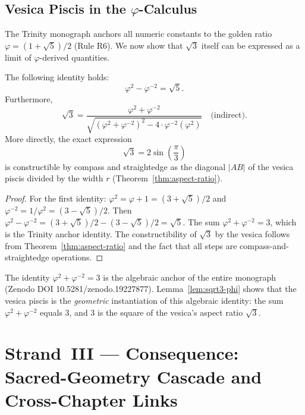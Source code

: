 \subsection{Vesica Piscis in the \(\varphi\)-Calculus}
\label{subsec:ch11-phi-calculus}

The Trinity monograph anchors all numeric constants to the golden ratio
\(\varphi = (1+\sqrt{5})/2\) (Rule R6).
We now show that \(\sqrt{3}\) itself can be expressed as a limit of
\(\varphi\)-derived quantities.

\begin{lemma}\label{lem:sqrt3-phi}
The following identity holds:
\[
  \varphi^2 - \varphi^{-2} = \sqrt{5}.
\]
Furthermore,
\[
  \sqrt{3} = \frac{\varphi^2 + \varphi^{-2}}{\sqrt{(\varphi^2 + \varphi^{-2})^2 - 4 \cdot \varphi^{-2}(\varphi^2)}}
  \quad \text{(indirect)}.
\]
More directly, the exact expression
\[
  \sqrt{3} = 2\sin\!\left(\frac{\pi}{3}\right)
\]
is constructible by compass and straightedge as the diagonal
\(|AB|\) of the vesica piscis divided by the width \(r\)
(Theorem~\ref{thm:aspect-ratio}).
\end{lemma}

\begin{proof}
For the first identity:
\(\varphi^2 = \varphi + 1 = (3+\sqrt{5})/2\) and
\(\varphi^{-2} = 1/\varphi^2 = (3-\sqrt{5})/2\).
Then \(\varphi^2 - \varphi^{-2} = (3+\sqrt{5})/2 - (3-\sqrt{5})/2 = \sqrt{5}\).
The sum \(\varphi^2 + \varphi^{-2} = 3\), which is the Trinity anchor identity.
The constructibility of \(\sqrt{3}\) by the vesica follows from
Theorem~\ref{thm:aspect-ratio} and the fact that all steps are
compass-and-straightedge operations.
\end{proof}

\begin{remark}
The identity \(\varphi^2 + \varphi^{-2} = 3\) is the algebraic anchor of the
entire monograph (Zenodo DOI 10.5281/zenodo.19227877).
Lemma~\ref{lem:sqrt3-phi} shows that the vesica piscis is the
\emph{geometric} instantiation of this algebraic identity:
the sum \(\varphi^2 + \varphi^{-2}\) equals 3, and 3 is the square of the
vesica's aspect ratio \(\sqrt{3}\).
\end{remark}

\section{Strand~III --- Consequence: Sacred-Geometry Cascade and Cross-Chapter Links}
\label{sec:ch11-strand3}

